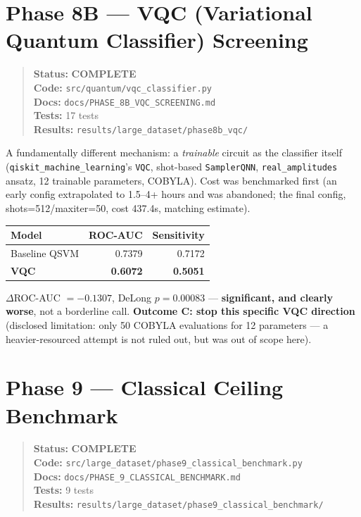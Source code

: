 \documentclass[11pt,a4paper]{article}
\newcommand{\code}[1]{\texttt{\small #1}}
\newcommand{\done}{\textcolor{donecolor}{\textbf{COMPLETE}}}
\newcommand{\phasestatus}[5]{%
\begin{quote}\small\raggedright
\textbf{Status:} #1 \\
\textbf{Code:} #2 \\
\textbf{Docs:} #3 \\
\textbf{Tests:} #4 \\
\textbf{Results:} #5
\end{quote}}
\begin{document}
\section{Phase 8B --- VQC (Variational Quantum Classifier) Screening}
\label{sec:phase8b}

\phasestatus{\done}{\code{src/quantum/vqc\_classifier.py}}{\code{docs/PHASE\_8B\_VQC\_SCREENING.md}}{17 tests}{\code{results/large\_dataset/phase8b\_vqc/}}

A fundamentally different mechanism: a \emph{trainable} circuit as the classifier itself (\code{qiskit\_machine\_learning}'s \code{VQC}, shot-based \code{SamplerQNN}, \code{real\_amplitudes} ansatz, 12 trainable parameters, COBYLA). Cost was benchmarked first (an early config extrapolated to 1.5--4+ hours and was abandoned; the final config, shots=512/maxiter=50, cost 437.4s, matching estimate).

\begin{center}
\begin{tabular}{lrr}
\toprule
\textbf{Model} & \textbf{ROC-AUC} & \textbf{Sensitivity} \\
\midrule
Baseline QSVM & 0.7379 & 0.7172 \\
\textbf{VQC} & \textbf{0.6072} & \textbf{0.5051} \\
\bottomrule
\end{tabular}
\end{center}

$\Delta$ROC-AUC $=-0.1307$, DeLong $p=0.00083$ --- \textbf{significant, and clearly worse}, not a borderline call. \textbf{Outcome C: stop this specific VQC direction} (disclosed limitation: only 50 COBYLA evaluations for 12 parameters --- a heavier-resourced attempt is not ruled out, but was out of scope here).

\section{Phase 9 --- Classical Ceiling Benchmark}
\label{sec:phase9}

\phasestatus{\done}{\code{src/large\_dataset/phase9\_classical\_benchmark.py}}{\code{docs/PHASE\_9\_CLASSICAL\_BENCHMARK.md}}{9 tests}{\code{results/large\_dataset/phase9\_classical\_benchmark/}}
\end{document}

